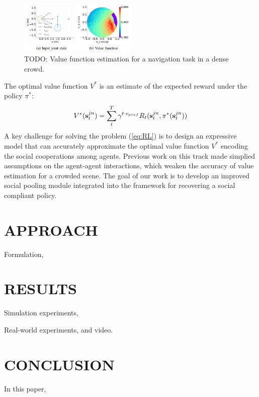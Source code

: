 \documentclass[letterpaper, 10 pt, conference]{ieeeconf}  %
\begin{document}
\begin{figure} [t]
  \captionsetup{font=small}
  \includegraphics[width=0.5\textwidth]{figures/vf} 
  \caption{TODO: Value function estimation for a navigation task in a dense crowd.}
  \label{fig:overview}
\end{figure}

The optimal value function $V^*$ is an estimate of the expected reward under the policy $\pi^*$: 
\begin{equation}
V^*(\bold{s}_t^{jn}) = \sum_{t}^T \gamma^{t \cdot v_{pref}} R_t(\bold{s}_t^{jn},\pi^*(\bold{s}_t^{jn}))
\end{equation}
A key challenge for solving the problem (\ref{eq:RL}) is to design an expressive model that can accurately approximate the optimal value function $V^{*}$ encoding the social cooperations among agents. Previous work on this track made simplied assumptions on the agent-agent interactions, which weaken the accuracy of value estimation for a crowded scene. The goal of our work is to develop an improved social pooling module integrated into the framework for recovering a social compliant policy. 

\section{APPROACH} \label{sec:approach} 

Formulation, 

\section{RESULTS} \label{sec:results} 

Simulation experiments, 

Real-world experiments, and video. 

\section{CONCLUSION} \label{sec:conclusion} 

In this paper, 

\end{document}

